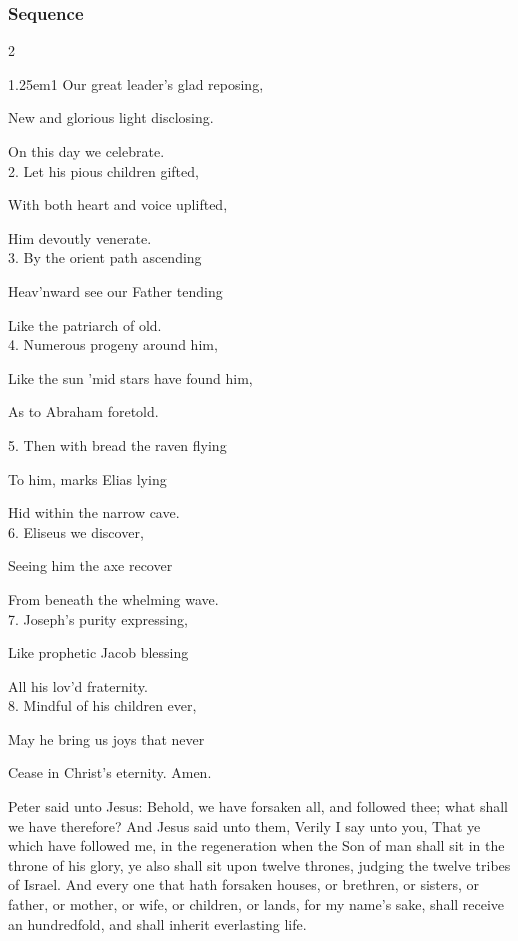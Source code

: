\subsubsection{Sequence}
\begin{multicols}{2}
\begin{hangparas}{1.25em}{1}
Our great leader's glad reposing,

New and glorious light disclosing.

On this day we celebrate.\\

2. Let his pious children gifted,

With both heart and voice uplifted,

Him devoutly venerate.\\

3. By the orient path ascending

Heav'nward see our Father tending

Like the patriarch of old.\\

4. Numerous progeny around him,

Like the sun 'mid stars have found him,

As to Abraham foretold.%

\newcolumn

5. Then with bread the raven flying

To him, marks Elias lying

Hid within the narrow cave.\\

6. Eliseus we discover,

Seeing him the axe recover

From beneath the whelming wave.\\

7. Joseph's purity expressing,

Like prophetic Jacob blessing

All his lov'd fraternity.\\

8. Mindful of his children ever,

May he bring us joys that never

Cease in Christ's eternity. Amen.\\
\end{hangparas}
\end{multicols}

\clearpage
{}
 Peter said unto Jesus: Behold, we have forsaken all, and followed thee; what shall we have therefore? And Jesus said unto them, Verily I say unto you, That ye which have followed me, in the regeneration when the Son of man shall sit in the throne of his glory, ye also shall sit upon twelve thrones, judging the twelve tribes of Israel. And every one that hath forsaken houses, or brethren, or sisters, or father, or mother, or wife, or children, or lands, for my name's sake, shall receive an hundredfold, and shall inherit everlasting life.

